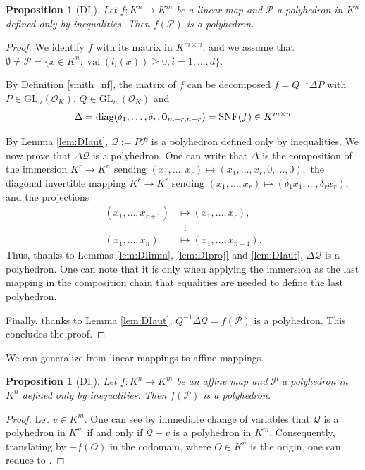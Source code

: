 \documentclass[sigconf]{acmart}
\newcommand{\N}{\mathbb{N}} %
\newcommand{\PP}{\mathcal{P}}
\newcommand{\Qc}{\mathcal{Q}}
\newtheorem{proposition}[theorem]{Proposition}
\DeclareMathOperator{\val}{val}
\newcommand{\OK}{\mathcal{O}_K}
\def\diag{\mathrm{diag}}
\newcommand{\GL}{\mathrm{GL}}
\begin{document}
\begin{proposition}[DI${}_{\mathrm{l}}$]
Let $f : K^n \to K^m$ be a linear map and $\PP$ a polyhedron in $K^n$ defined only by inequalities.
Then $f(\PP)$ is a polyhedron. \label{prop:DIl}
\end{proposition}
\begin{proof}
  We identify $f$ with its matrix in $K^{m \times n}$, and we
  assume that $\emptyset \neq \PP = \{x \in K^n : \val(l_i(x)) \geq 0, i=1,\ldots,d\}$.
  
  By Definition \ref{smith_nf}, the matrix of $f$ can be decomposed
  $f = Q^{-1} \Delta P$ with $P \in \GL_n(\OK)$, $Q \in \GL_m(\OK)$ and
  $$
  \Delta = \diag(\delta_1, \ldots, \delta_r, {\bf 0}_{m-r,n-r}) = \mathrm{SNF}(f)\in K^{m \times n}
  $$

By Lemma \ref{lem:DIaut}, $\Qc := P \PP$ is a polyhedron defined only by inequalities.
We now prove that $\Delta \Qc$ is a polyhedron. One can write that $\Delta$ is the composition
of the immersion 
$K^r \rightarrow K^n$ sending
$(x_1,\dots,x_r)\mapsto (x_1,\dots,x_r,0,\dots,0),$ 
 the diagonal invertible mapping
$K^r \rightarrow K^r$ sending
$(x_1,\dots,x_r)\mapsto (\delta_1 x_1,\dots,\delta_r x_r)$,
and the projections
\begin{equation*}
  \begin{aligned}
    (x_1,\dots,x_{r+1}) &\mapsto (x_1,\dots,x_{r}),   \\
    & \,\,\,\, \vdots \\
    (x_1,\dots,x_{n}) &\mapsto (x_1,\dots,x_{n-1}).
  \end{aligned}
\end{equation*}
Thus, thanks to Lemmas \ref{lem:DIimm}, \ref{lem:DIproj} and \ref{lem:DIaut},
$\Delta \Qc$ is a polyhedron. One can note that it is only when applying the
immersion as the last mapping in the composition chain that equalities are
needed to define the last polyhedron.

Finally, thanks to Lemma \ref{lem:DIaut},
$Q^{-1} \Delta \Qc = f(\PP)$ is a polyhedron.
This concludes the proof.
\end{proof}

We can generalize from linear mappings to affine mappings.
\begin{proposition}[DI${}_{\mathrm{i}}$]
Let $f : K^n \to K^m$ be an affine map and $\PP$ a polyhedron in $K^n$ defined only by inequalities.
Then $f(\PP)$ is a polyhedron. \label{prop:DIi}
\end{proposition}
\begin{proof}
  Let $v \in K^m$. One can see by immediate change
  of variables that $\Qc$ is a polyhedron in $K^m$ if and only if
  $\Qc+v$ is a polyhedron in $K^m$.
  Consequently, translating by $-f(O)$ in the codomain, where
  $O \in K^n$ is the origin, one can reduce to .
\end{proof}
\end{document}
